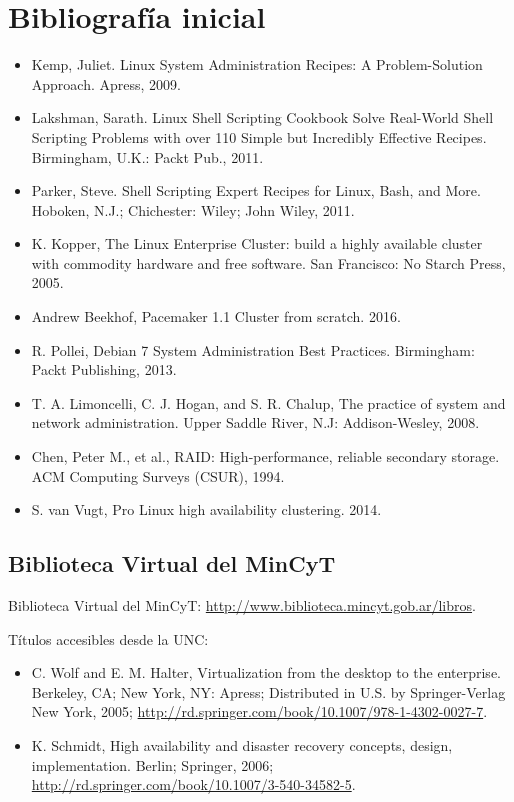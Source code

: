 \section {Bibliografía inicial}
\begin{itemize}
	\item Kemp, Juliet. Linux System Administration Recipes: A Problem-Solution Approach. Apress, 2009. 
	\item Lakshman, Sarath. Linux Shell Scripting Cookbook Solve Real-World Shell Scripting Problems with over 110 Simple but Incredibly Effective Recipes. Birmingham, U.K.: Packt Pub., 2011. 
	\item Parker, Steve. Shell Scripting Expert Recipes for Linux, Bash, and More. Hoboken, N.J.; Chichester: Wiley; John Wiley, 2011.
	\item K. Kopper, The Linux Enterprise Cluster: build a highly available cluster with commodity hardware and free software. San Francisco: No Starch Press, 2005.
	\item Andrew Beekhof, Pacemaker 1.1 Cluster from scratch. 2016.
	\item R. Pollei, Debian 7 System Administration Best Practices. Birmingham: Packt Publishing, 2013.
	\item T. A. Limoncelli, C. J. Hogan, and S. R. Chalup, The practice of system and network administration. Upper Saddle River, N.J: Addison-Wesley, 2008.
	\item Chen, Peter M., et al., RAID: High-performance, reliable secondary storage. ACM Computing Surveys (CSUR), 1994.
	\item S. van Vugt, Pro Linux high availability clustering. 2014.


\end{itemize}

\subsection{Biblioteca Virtual del MinCyT}

Biblioteca Virtual del MinCyT: \url{http://www.biblioteca.mincyt.gob.ar/libros}.

Títulos accesibles desde la UNC:

\begin{itemize}
	\item C. Wolf and E. M. Halter, Virtualization from the desktop to the enterprise. Berkeley, CA; New York, NY: Apress; Distributed in U.S. by Springer-Verlag New York, 2005; \url{http://rd.springer.com/book/10.1007/978-1-4302-0027-7}.
	\item K. Schmidt, High availability and disaster recovery concepts, design, implementation. Berlin; Springer, 2006; \url{http://rd.springer.com/book/10.1007/3-540-34582-5}.	
\end{itemize}
